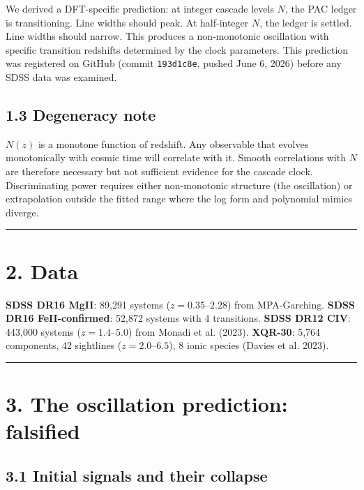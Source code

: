 \documentclass[11pt,a4paper]{article}
\begin{document}
We derived a DFT-specific prediction: at integer cascade levels $N$, the PAC ledger is transitioning. Line widths should peak. At half-integer $N$, the ledger is settled. Line widths should narrow. This produces a non-monotonic oscillation with specific transition redshifts determined by the clock parameters. This prediction was registered on GitHub (commit \texttt{193d1c8e}, pushed June 6, 2026) before any SDSS data was examined.

\subsection*{1.3 Degeneracy note}

$N(z)$ is a monotone function of redshift. Any observable that evolves monotonically with cosmic time will correlate with it. Smooth correlations with $N$ are therefore necessary but not sufficient evidence for the cascade clock. Discriminating power requires either non-monotonic structure (the oscillation) or extrapolation outside the fitted range where the log form and polynomial mimics diverge.

\begin{center}\rule{0.5\linewidth}{0.4pt}\end{center}

\section*{2. Data}

\textbf{SDSS DR16 MgII}: 89,291 systems ($z = 0.35$–$2.28$) from MPA-Garching. \textbf{SDSS DR16 FeII-confirmed}: 52,872 systems with 4 transitions. \textbf{SDSS DR12 CIV}: 443,000 systems ($z = 1.4$–$5.0$) from Monadi et al. (2023). \textbf{XQR-30}: 5,764 components, 42 sightlines ($z = 2.0$–$6.5$), 8 ionic species (Davies et al. 2023).

\begin{center}\rule{0.5\linewidth}{0.4pt}\end{center}

\section*{3. The oscillation prediction: falsified}

\subsection*{3.1 Initial signals and their collapse}
\end{document}
